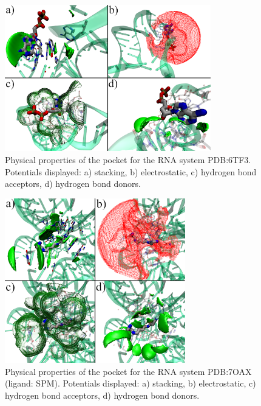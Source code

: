 \begin{figure}[H]
  \centering
  \includegraphics[width=0.8\textwidth]{figures/appendix/benchmark_rna/6tf3.png}
  \caption{\label{fig:appx_benchmark/6tf3} Physical properties of the pocket for the RNA system PDB:6TF3. Potentials displayed: a) stacking, b) electrostatic, c) hydrogen bond acceptors, d) hydrogen bond donors.}
\end{figure}

\begin{figure}[H]
  \centering
  \includegraphics[width=0.7\textwidth]{figures/appendix/benchmark_rna/7oax0.png}
  \caption{\label{fig:appx_benchmark/7oax0} Physical properties of the pocket for the RNA system PDB:7OAX (ligand: SPM). Potentials displayed: a) stacking, b) electrostatic, c) hydrogen bond acceptors, d) hydrogen bond donors.}
\end{figure}

